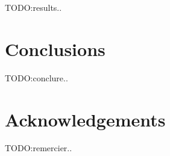 \documentclass{article}
\begin{document}
TODO:results..


\section{Conclusions}
\label{sec:conclusions}

TODO:conclure..



\section{Acknowledgements}
\label{sec:conclusions}

TODO:remercier..





\end{document}
